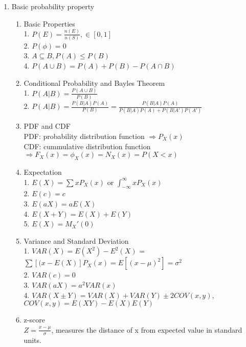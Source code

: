\documentclass[10pt]{article}
\begin{document}
\begin{multicols}{2}
\begin{enumerate}
			\item Basic probability property
			\begin{enumerate}
				\item Basic Properties\\
				1. $P(E) = \frac{n(E)}{n(S)}, \in[0,1]$\\
				2. $P(\phi) = 0$\\
				3. $A\subseteq B, P(A) \le P(B)$\\
				4. $P(A\cup B) = P(A) + P(B) - P(A\cap B)$
				\item Conditional Probability and Bayles Theorem\\
				1. $P(A|B) = \frac{P(A\cup B)}{P(B)}$\\
				2. $P(A|B) = \frac{P(B|A)P(A)}{P(B)} = \frac{P(B|A)P(A)}{P(B|A)P(A) + P(B|A')P(A')} $
				\item PDF and CDF\\
				PDF: probability distribution function $\Rightarrow P_X(x)$ \\
				CDF: cummulative distribution function $\Rightarrow F_X(x) = \phi_X(x) = N_X(x) = P(X < x)$
				\item Expectation\\
				1. $E(X) = \sum xP_X(x)$ or $\int_{-\infty}^{\infty}xP_X(x)$\\
				2. $E(c) = c$\\
				3. $E(aX) = aE(X)$\\
				4. $E(X+Y) = E(X) + E(Y)$\\
				5. $E(X) = M_X'(0)$
				\item Variance and Standard Deviation\\
				1. $VAR(X) = E(X^2)-E^2(X)$ = $\sum[(x-E(X)]P_X(x) = E[(x-\mu)^2] = \sigma^2$\\
				2. $VAR(c) = 0$\\
				3. $VAR(aX) = a^2VAR(x)$\\
				4. $VAR(X\pm Y) = VAR(X) + VAR(Y) \pm 2COV(x,y)$, $COV(x,y) = E(XY)-E(X)E(Y)$
				\item z-score\\
				$Z = \frac{x-\mu}{\sigma}$, measures the distance of x from expected value in standard units.
			\end{enumerate}
		

\end{enumerate}
\end{multicols}
\end{document}

